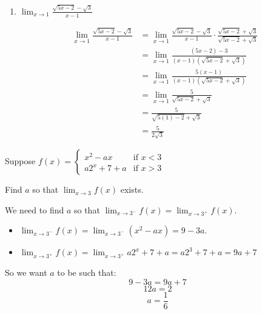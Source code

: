 \message{ !name(limitLaws.tex)}\documentclass[handout,nooutcomes]{ximera}
\begin{document}
\begin{problem}
\begin{enumerate}
	
	\item  $ \lim_{x \to 1} \frac{\sqrt{5x-2} - \sqrt{3}}{x-1} $
	\begin{freeResponse}
	\begin{align*}
	\lim_{x \to 1} \frac{\sqrt{5x-2} - \sqrt{3}}{x-1} &= \lim_{x \to 1} \frac{\sqrt{5x-2} - \sqrt{3}}{x-1} \cdot \frac{\sqrt{5x-2} + \sqrt{3}}{\sqrt{5x-2} + \sqrt{3}} \\
	&= \lim_{x \to 1} \frac{(5x-2)-3}{(x-1)(\sqrt{5x-2} + \sqrt{3})} \\
	&= \lim_{x \to 1} \frac{5(x-1)}{(x-1)(\sqrt{5x-2} + \sqrt{3})} \\
	&= \lim_{x \to 1} \frac{5}{\sqrt{5x-2} + \sqrt{3}} \\
	&=   \frac{5}{\sqrt{5(1)-2} + \sqrt{3}} \\
	&= \frac{5}{2 \sqrt{3}} 
	\end{align*}
	\end{freeResponse}
	\end{enumerate}
\end{problem}
	
	
	
	
			
			

\begin{problem}
Suppose
	$f(x) =   \left\{ \begin{array}{lr}
	x^2 - ax 	&	\text{if } x < 3	\\
	a2^x + 7 + a	&	\text{if } x > 3	\end{array} \right.  $
	
	Find $a$ so that $ \lim_{x \to 3} f(x)  $ exists.
	\begin{freeResponse}
	 We need to find $a$ so that $\lim_{x \to 3^-} f(x) = \lim_{x \to 3^+} f(x) $.  
	
	\begin{itemize}
	
	\item  $\lim_{x \to 3^-} f(x) = \lim_{x \to 3^-} (x^2 - ax) = 9 - 3a $.
	
	\item  $\lim_{x \to 3^+} f(x) = \lim_{x \to 3^+} a2^x + 7 + a = a2^3 + 7 + a = 9a + 7 $
	
	\end{itemize}
	
	So we want $a$ to be such that:
	$$ 9-3a = 9a+7 $$
	$$12a = 2 $$
	$$a = \frac{1}{6}   $$
	\end{freeResponse}
\end{problem}
	
\end{document}
